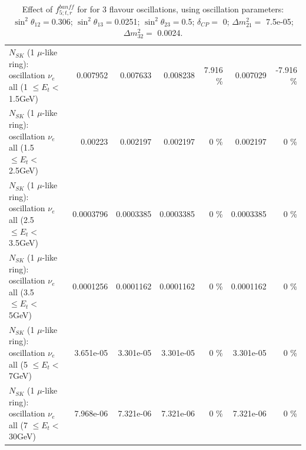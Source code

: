 \begin{table}
\begin{tabular}{| l | r | r | r  r | r  r |}
$N_{SK}$ (1 $\mu$-like ring): oscillation $\nu_{e}$ all (1 $\leq E_{t} <$ 1.5GeV) &        0.007952 &        0.007633 &        0.008238 &    7.916 \%  &        0.007029 &   -7.916 \%  \\ 
$N_{SK}$ (1 $\mu$-like ring): oscillation $\nu_{e}$ all (1.5 $\leq E_{t} <$ 2.5GeV) &         0.00223 &        0.002197 &        0.002197 &        0 \%  &        0.002197 &        0 \%  \\ 
$N_{SK}$ (1 $\mu$-like ring): oscillation $\nu_{e}$ all (2.5 $\leq E_{t} <$ 3.5GeV) &       0.0003796 &       0.0003385 &       0.0003385 &        0 \%  &       0.0003385 &        0 \%  \\ 
$N_{SK}$ (1 $\mu$-like ring): oscillation $\nu_{e}$ all (3.5 $\leq E_{t} <$ 5GeV) &       0.0001256 &       0.0001162 &       0.0001162 &        0 \%  &       0.0001162 &        0 \%  \\ 
 $N_{SK}$ (1 $\mu$-like ring): oscillation $\nu_{e}$ all (5 $\leq E_{t} <$ 7GeV) &       3.651e-05 &       3.301e-05 &       3.301e-05 &        0 \%  &       3.301e-05 &        0 \%  \\ 
$N_{SK}$ (1 $\mu$-like ring): oscillation $\nu_{e}$ all (7 $\leq E_{t} <$ 30GeV) &       7.968e-06 &       7.321e-06 &       7.321e-06 &        0 \%  &       7.321e-06 &        0 \%  \\ 
\hline
\hline
\end{tabular}
\caption{ Effect of $f_{5; t, r}^{banff}$ for for 3 flavour oscillations, using oscillation parameters:  $\sin^2\theta_{12} = $0.306; $\sin^2\theta_{13} = $0.0251; $\sin^2\theta_{23} = $0.5; $\delta_{CP} = $        0; $\Delta m^2_{21} = $    7.5e-05; $\Delta m^2_{32} = $    0.0024. }
\label{tab:num_banff_05_1RmuT_3f_osc_t13:0.0251}
\end{table}
\clearpage
